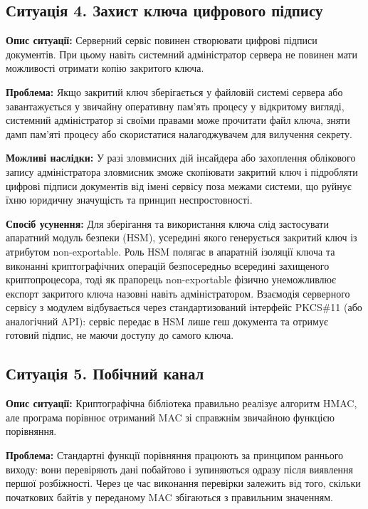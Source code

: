 \subsection{Ситуація 4. Захист ключа цифрового підпису}

\textbf{Опис ситуації:}
Серверний сервіс повинен створювати цифрові підписи документів. При цьому навіть
системний адміністратор сервера не повинен мати можливості отримати копію
закритого ключа.

\textbf{Проблема:}
Якщо закритий ключ зберігається у файловій системі сервера або завантажується у звичайну оперативну
пам'ять процесу у відкритому вигляді, системний адміністратор зі своїми правами може прочитати файл
ключа, зняти дамп пам'яті процесу або скористатися налагоджувачем для вилучення секрету.

\textbf{Можливі наслідки:}
У разі зловмисних дій інсайдера або захоплення облікового запису адміністратора зловмисник зможе
скопіювати закритий ключ і підробляти цифрові підписи документів від імені сервісу поза межами системи,
що руйнує їхню юридичну значущість та принцип неспростовності.

\textbf{Спосіб усунення:}
Для зберігання та використання ключа слід застосувати апаратний модуль безпеки (HSM), усередині якого
генерується закритий ключ із атрибутом non-exportable. Роль HSM полягає в апаратній ізоляції ключа та
виконанні криптографічних операцій безпосередньо всередині захищеного криптопроцесора, тоді як
прапорець non-exportable фізично унеможливлює експорт закритого ключа назовні навіть адміністратором.
Взаємодія серверного сервісу з модулем відбувається через стандартизований інтерфейс PKCS\#11 (або
аналогічний API): сервіс передає в HSM лише геш документа та отримує готовий підпис, не маючи доступу до
самого ключа.


\subsection{Ситуація 5. Побічний канал}

\textbf{Опис ситуації:}
Криптографічна бібліотека правильно реалізує алгоритм HMAC, але програма порівнює
отриманий MAC зі справжнім звичайною функцією порівняння.

\textbf{Проблема:}
Стандартні функції порівняння працюють за принципом раннього виходу: вони перевіряють дані побайтово і
зупиняються одразу після виявлення першої розбіжності. Через це час виконання перевірки залежить від
того, скільки початкових байтів у переданому MAC збігаються з правильним значенням.

